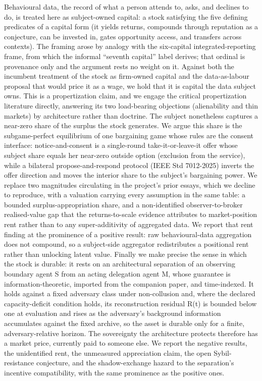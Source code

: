 \documentclass[
  11pt,
]{article}
\newcounter{none} %
\begin{document}
Behavioural data, the record of what a person attends to, asks, and
declines to do, is treated here as subject-owned capital: a stock
satisfying the five defining predicates of a capital form (it yields
returns, compounds through reputation as a conjecture, can be invested
in, gates opportunity access, and transfers across contexts). The
framing arose by analogy with the six-capital integrated-reporting
frame, from which the informal ``seventh capital'' label derives; that
ordinal is provenance only and the argument rests no weight on it.
Against both the incumbent treatment of the stock as firm-owned capital
and the data-as-labour proposal that would price it as a wage, we hold
that it is capital the data subject owns. This is a propertization
claim, and we engage the critical propertization literature directly,
answering its two load-bearing objections (alienability and thin
markets) by architecture rather than doctrine. The subject nonetheless
captures a near-zero share of the surplus the stock generates. We argue
this share is the subgame-perfect equilibrium of one bargaining game
whose rules are the consent interface: notice-and-consent is a
single-round take-it-or-leave-it offer whose subject share equals her
near-zero outside option (exclusion from the service), while a bilateral
propose-and-respond protocol (IEEE Std 7012-2025) inverts the offer
direction and moves the interior share to the subject's bargaining
power. We replace two magnitudes circulating in the project's prior
essays, which we decline to reproduce, with a valuation carrying every
assumption in the same table: a bounded surplus-appropriation share, and
a non-identified observer-to-broker realised-value gap that the
returns-to-scale evidence attributes to market-position rent rather than
to any super-additivity of aggregated data. We report that rent finding
at the prominence of a positive result: raw behavioural-data aggregation
does not compound, so a subject-side aggregator redistributes a
positional rent rather than unlocking latent value. Finally we make
precise the sense in which the stock is durable: it rests on an
architectural separation of an observing boundary agent S from an acting
delegation agent M, whose guarantee is information-theoretic, imported
from the companion paper, and time-indexed. It holds against a fixed
adversary class under non-collusion and, where the declared
capacity-deficit condition holds, its reconstruction residual R(t) is
bounded below one at evaluation and rises as the adversary's background
information accumulates against the fixed archive, so the asset is
durable only for a finite, adversary-relative horizon. The sovereignty
the architecture protects therefore has a market price, currently paid
to someone else. We report the negative results, the unidentified rent,
the unmeasured appreciation claim, the open Sybil-resistance conjecture,
and the shadow-exchange hazard to the separation's incentive
compatibility, with the same prominence as the positive ones.
\end{document}
